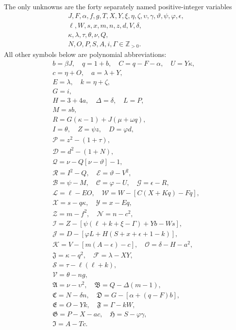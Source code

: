 The only unknowns are the forty separately named positive-integer variables
\[
\begin{gathered}J,F,\alpha,f,g,T,X,Y,\xi,\eta,\zeta,\upsilon,\gamma,\vartheta,\psi,\varphi,\epsilon,\\
\ell,W,s,x,m,n,z,d,V,\delta,\\
\kappa,\lambda,\tau,\theta,\nu,Q,\\
N,O,P,S,A,i,\Gamma\in\mathbb Z_{>0}.\end{gathered}
\]
All other symbols below are polynomial abbreviations:
\[
\begin{gathered}
b=\beta J,\quad q=1+b,\quad C=q-F-\alpha,\quad U=Y\kappa,\\
c=\eta+O,\quad a=\lambda+Y,\\
E=\lambda,\quad k=\eta+\zeta,\\
G=i,\\
H=3+4a,\quad\Delta=\delta,\quad L=P,\\
M=sb,\\
R=G(\kappa-1)+J(\mu+\omega q),\\
I=\theta,\quad Z=\psi z,\quad D=\varphi d,\\
\mathcal{P}=z^2-(1+\tau),\\
\mathcal{D}=d^2-(1+N),\\
\mathcal{Q}=\nu-Q[\nu-\vartheta]-1,\\
\mathcal{R}=I^2-Q,\quad \mathcal{E}=\vartheta-V^2,\\
\mathcal{B}=\psi-M,\quad \mathcal{C}=\varphi-U,\quad \mathcal{G}=\epsilon-R,\\
\mathcal{L}=\ell-EO,\quad \mathcal{W}=W-[C(X+Kq)-Fq],\\
\mathcal{X}=s-q\kappa,\quad \mathcal{Y}=x-Eq,\\
\mathcal{Z}=m-f^2,\quad \mathcal{N}=n-c^2,\\
\mathcal{I}=Z-[\psi(\ell+k+\xi-\Gamma)+Yb-Ws],\\
\mathcal{J}=D-[\varphi L+H(S+x+\epsilon+1-k)],\\
\mathcal{K}=V-[m(A-\epsilon)-c],\quad\mathcal{O}=\delta-H-a^2,\\
\mathfrak{J}=\kappa-q^2,\quad\mathcal{F}=\lambda-XY,\\
\mathcal{S}=\tau-\ell(\ell+k),\\
\mathcal{V}=\theta-ng,\\
\mathfrak{A}=\nu-\upsilon^2,\quad\mathfrak{B}=Q-\Delta(m-1),\\
\mathfrak{C}=N-\delta n,\quad\mathfrak{D}=G-[\alpha+(q-F)b],\\
\mathfrak{E}=O-Yk,\quad\mathfrak{F}=\Gamma-kW,\\
\mathfrak{G}=P-X-ac,\quad\mathfrak{H}=S-\varphi\gamma,\\
\mathfrak{I}=A-Tc.
\end{gathered}
\]
